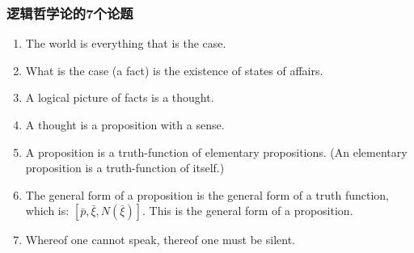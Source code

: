 \documentclass[compress]{beamer}
\begin{document}
\begin{comment}
在八十年前面向对象是作为认识世界的哲学思想被提出的，这种思想由本世纪最伟
大的哲学家维特根斯坦阐述于1922出版的《逻辑哲学论》（《
Logisch-Philosophische Abhandlung》）这一著作中。维特根斯坦认为：世界是
由简单的基本的对象构成的（《逻辑哲学论》2.021 对象构成世界的实体，因此它
们不能是复合的），这就是面向对象设计的基石。

  维特根斯坦在《逻辑哲学论》 一书中提出了如下思想：
  世界可以分解为事实 ( The world divides into facts.)
  事实是由原子事实(atomic facts)组成的。
  一个原子事实是多个对象(objects)的组合。
  对象是简单的(基本的) The Object is simple。
  对象形成了世界的基础。

  面向对象的两大核心概念是：“对象”与“类”。“一切皆是对象”是由朴素原子论而
  来的。“万物皆有类属”就是由亚里斯多德的形而上学来的。

在正文中有七个主要命题。它们是:

    世界是所有发生的事物。
    发生的事物(事实)是原子性事态的存在。
    事实的逻辑图像是思想。
    思想是有意义的命题。
    命题是基本命题的真值函数。
    命题的一般形式是真值函数的一般形式，它是: [{\bar p},{\bar \xi },N({\bar \xi })]。这也是命题的一般形式。
    对于不可说的东西我们必须保持沉默。

\end{comment}

\begin{frame}
\frametitle{逻辑哲学论的7个论题}
\begin{enumerate}

\item The world is everything that is the case.
\item What is the case (a fact) is the existence of states of affairs.
\item A logical picture of facts is a thought.
\item A thought is a proposition with a sense.
\item A proposition is a truth-function of elementary propositions. (An elementary proposition is a truth-function of itself.)
\item The general form of a proposition is the general form of a truth function, which is: $[\bar p,\bar\xi, N(\bar\xi)]$. This is the general form of a proposition.
\item Whereof one cannot speak, thereof one must be silent.
\end{enumerate}
\end{frame}
\end{document}
